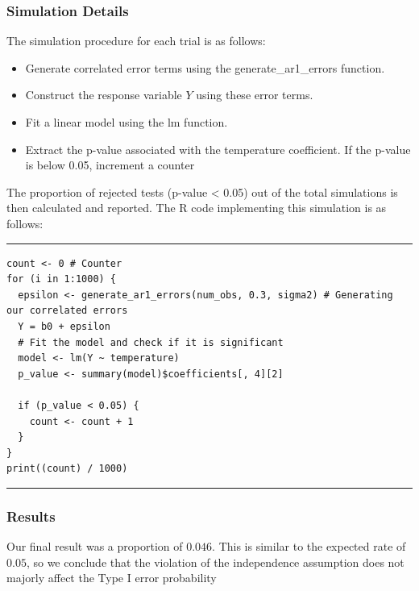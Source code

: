\documentclass{article}
\begin{document}
\subsubsection*{Simulation Details}
The simulation procedure for each trial is as follows:
\begin{itemize}
    \item Generate correlated error terms using the generate\_ar1\_errors function.
    \item Construct the response variable $Y$ using these error terms.
    \item Fit a linear model using the lm function.
    \item Extract the p-value associated with the temperature coefficient. If the p-value is below 0.05, increment a counter
\end{itemize}
The proportion of rejected tests (p-value < 0.05) out of the total simulations is then calculated and reported. The R code implementing this simulation is as follows:
\par\noindent\rule{\textwidth}{0.4pt}
\vspace{-25pt} %
\begin{verbatim}
count <- 0 # Counter
for (i in 1:1000) {
  epsilon <- generate_ar1_errors(num_obs, 0.3, sigma2) # Generating our correlated errors
  Y = b0 + epsilon
  # Fit the model and check if it is significant
  model <- lm(Y ~ temperature)
  p_value <- summary(model)$coefficients[, 4][2]
  
  if (p_value < 0.05) {
    count <- count + 1
  }
}
print((count) / 1000)
\end{verbatim}
\vspace{-15pt} %
\par\noindent\rule{\textwidth}{0.4pt}
\subsubsection*{Results}
Our final result was a proportion of $0.046$. This is similar to the expected rate of $0.05$, so we conclude that the violation of the independence assumption does not majorly affect the Type I error probability
\end{document}
